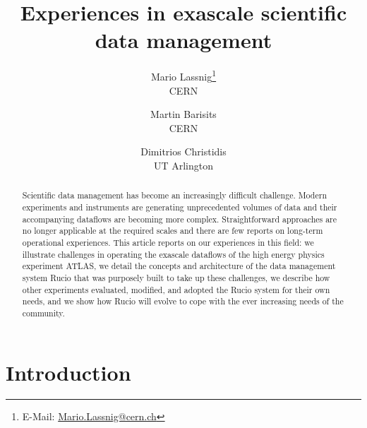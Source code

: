 \documentclass[11pt]{article}
\begin{document}
\title{Experiences in exascale scientific data management}

\author{
Mario Lassnig\thanks{E-Mail: \href{mailto:Mario.Lassnig@cern.ch?subject=IEEE Bulletin: Exascale scientific data management}{Mario.Lassnig@cern.ch}}\\CERN \and
Martin Barisits\\CERN \and
Dimitrios Christidis\\UT Arlington
}

\maketitle

\begin{abstract}
Scientific data management has become an increasingly difficult challenge. Modern experiments and instruments are generating unprecedented volumes of data and their accompanying dataflows are becoming more complex. Straightforward approaches are no longer applicable at the required scales and there are few reports on long-term operational experiences. This article reports on our experiences in this field: we illustrate challenges in operating the exascale dataflows of the high energy physics experiment ATLAS, we detail the concepts and architecture of the data management system Rucio that was purposely built to take up these challenges, we describe how other experiments evaluated, modified, and adopted the Rucio system for their own needs, and we show how Rucio will evolve to cope with the ever increasing needs of the community.
\end{abstract}

\section{Introduction}
\end{document}
